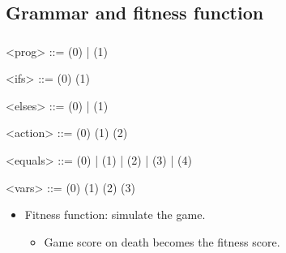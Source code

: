 \documentclass{beamer}
\makeatletter
\newcommand*{\currentname}{\@currentlabelname}
\makeatother
\begin{document}
\subsection{Grammar and fitness function}
\begin{frame}
\frametitle{\currentname}

\begin{grammar}
\small
<prog>      ::=   (0) |   (1) 				   \hspace{1em}

<ifs>     ::=    
				  \lit*{ )\{ }  \lit*{ \}}	\hfill (0) \hspace{1em}
		\alt   {}   
				  \lit*{ )\{ }  \lit*{ \}}	\hfill (1) \hspace{1em}
				 
<elses>   ::=       \lit*{ \}}  (0) |
			      \lit*{ \}}  (1)


<action> ::=   						  		\hfill (0) \hspace{1em}
		 \alt {} 						\hfill (1) \hspace{1em}
		 \alt {} 						\hfill (2) \hspace{1em}
		 
<equals> ::=  \lit*{<} (0)  | \lit*{<=} (1) | \lit*{>} (2) 
		 | \lit*{>=} (3) | \lit*{==} (4)									   \hspace{1em}

<vars> ::=   						  	\hfill (0) \hspace{1em}
	   \alt {} 							\hfill (1) \hspace{1em}
	   \alt {} 							\hfill (2) \hspace{1em}
 	   \alt {} 										\hfill (3) \hspace{1em}
 	   
\end{grammar}
\vspace{-1em}
\begin{itemize}
	\item Fitness function: simulate the game.
	\begin{itemize}
		\item Game score on death becomes the fitness score.
	\end{itemize}
\end{itemize}


\end{frame}
\end{document}
